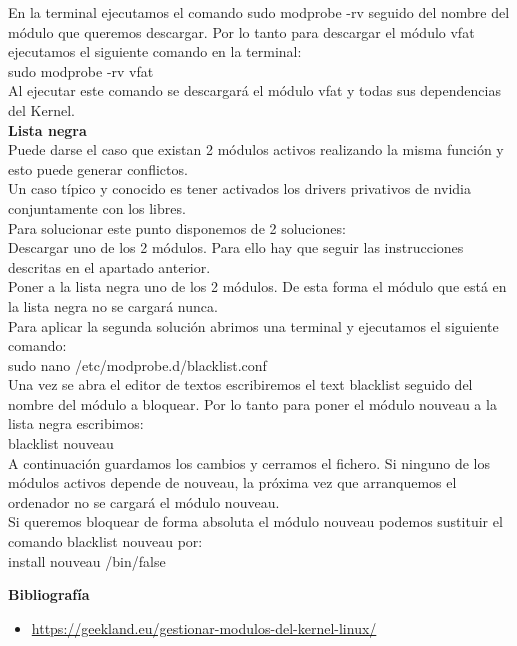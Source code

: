 \documentclass[11pt, a4paper]{report}
\begin{document}
En la terminal ejecutamos el comando sudo modprobe -rv seguido del nombre
del módulo que queremos descargar. Por lo tanto para descargar el módulo
vfat ejecutamos el siguiente comando en la terminal: \\

sudo modprobe -rv vfat \\

Al ejecutar este comando se descargará el módulo vfat y todas sus
dependencias del Kernel.
\\
\textbf{Lista negra} \\

Puede darse el caso que existan 2 módulos activos realizando la misma
función y esto puede generar conflictos. \\

Un caso típico y conocido es tener activados los drivers privativos de
nvidia conjuntamente con los libres. \\

Para solucionar este punto disponemos de 2 soluciones: \\

Descargar uno de los 2 módulos. Para ello hay que seguir las
instrucciones descritas en el apartado anterior. \\

Poner a la lista negra uno de los 2 módulos. De esta forma el módulo que
está en la lista negra no se cargará nunca. \\

Para aplicar la segunda solución abrimos una terminal y ejecutamos el
siguiente comando: \\

sudo nano /etc/modprobe.d/blacklist.conf \\

Una vez se abra el editor de textos escribiremos el text blacklist
seguido del nombre del módulo a bloquear. Por lo tanto para poner el
módulo nouveau a la lista negra escribimos:\\

blacklist nouveau \\

A continuación guardamos los cambios y cerramos el fichero. Si ninguno de
los módulos activos depende de nouveau, la próxima vez que arranquemos el
ordenador no se cargará el módulo nouveau. \\

Si queremos bloquear de forma absoluta el módulo nouveau podemos
sustituir el comando blacklist nouveau por: \\

install nouveau /bin/false




\newpage

\textbf{Bibliografía} \\

\begin{itemize}

\item  \url{https://geekland.eu/gestionar-modulos-del-kernel-linux/}

\end{itemize}
\end{document}
